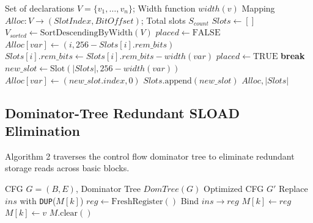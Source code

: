 \documentclass[conference]{IEEEtran}
\begin{document}
\begin{algorithm}
\caption{AST State Variable Slot Compaction}
\begin{algorithmic}[1]
\REQUIRE Set of declarations $V = \{v_1, \dots, v_n\}$; Width function $width(v)$
\ENSURE Mapping $Alloc: V \to (SlotIndex, BitOffset)$; Total slots $S_{count}$
\STATE $Slots \leftarrow []$
\STATE $V_{sorted} \leftarrow \text{SortDescendingByWidth}(V)$
    \STATE $placed \leftarrow \text{FALSE}$
            \STATE $Alloc[var] \leftarrow (i, 256 - Slots[i].rem\_bits)$
            \STATE $Slots[i].rem\_bits \leftarrow Slots[i].rem\_bits - width(var)$
            \STATE $placed \leftarrow \text{TRUE}$
            \STATE \textbf{break}
        \ENDIF
    \ENDFOR
        \STATE $new\_slot \leftarrow \text{Slot}(|Slots|, 256 - width(var))$
        \STATE $Alloc[var] \leftarrow (new\_slot.index, 0)$
        \STATE $Slots.\text{append}(new\_slot)$
    \ENDIF
\ENDFOR
\RETURN $Alloc, |Slots|$
\end{algorithmic}
\end{algorithm}

\subsection{Dominator-Tree Redundant SLOAD Elimination}
Algorithm 2 traverses the control flow dominator tree to eliminate redundant storage reads across basic blocks.

\begin{algorithm}
\caption{Dominator-Tree Redundant SLOAD Elimination}
\begin{algorithmic}[1]
\REQUIRE CFG $G = (B, E)$, Dominator Tree $DomTree(G)$
\ENSURE Optimized CFG $G'$
                \STATE Replace $ins$ with \texttt{DUP}($M[k]$)
            \ELSE
                \STATE $reg \leftarrow \text{FreshRegister}()$
                \STATE Bind $ins \to reg$
                \STATE $M[k] \leftarrow reg$
            \ENDIF
                \STATE $M[k] \leftarrow v$
            \ELSE
                \STATE $M.\text{clear}()$ 
            \ENDIF
        \ENDIF
    \ENDFOR
        \STATE {}
    \ENDFOR
\ENDPROCEDURE
\STATE {}
\end{algorithmic}
\end{algorithm}
\end{document}
